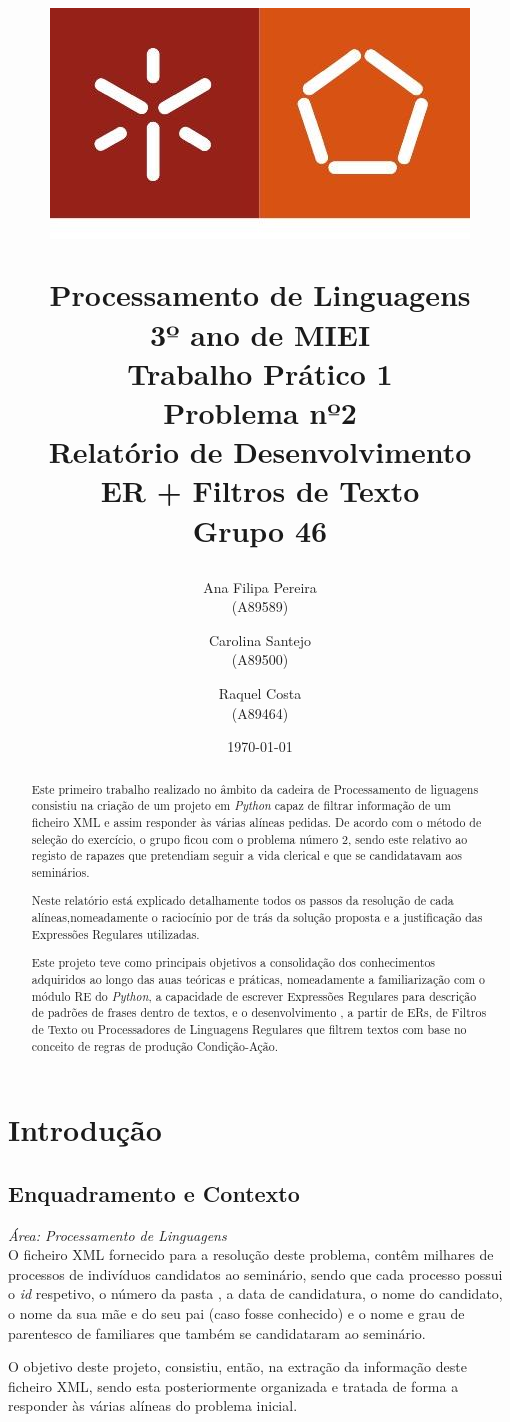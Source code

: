 \documentclass[11pt,a4paper]{report}
\title{

\begin{center}
\includegraphics[scale=0.3]{images/um}
\end{center}

Processamento de Linguagens \\
		3º ano de MIEI\\  \vspace{1cm}
       \textbf{Trabalho Prático 1\\ 
			Problema nº2}\\  \vspace{1cm} Relatório de Desenvolvimento \\
      ER + Filtros de Texto \\ \vspace{2cm}
\large{Grupo 46}}
\author{ Ana Filipa Pereira\\ (A89589) \and Carolina Santejo\\ (A89500)
         \and Raquel Costa\\ (A89464)
       }
\date{\vspace{2cm}\today}
\def\area#1{{\em \'{A}rea: #1}\\[0.2cm]}
\begin{document}
\maketitle %




\begin{abstract}  %
	\qquad Este primeiro trabalho realizado no âmbito da cadeira de Processamento de liguagens consistiu na criação de um projeto em \textit{Python} capaz de filtrar informação de um ficheiro XML e assim responder às várias alíneas pedidas. De acordo com o método de seleção do exercício, o grupo ficou com o problema número 2, sendo este relativo ao registo de rapazes que pretendiam seguir a vida clerical e que se candidatavam aos seminários.\par
	\qquad Neste relatório está explicado detalhamente todos os passos da resolução de cada alíneas,nomeadamente o raciocínio por de trás da solução proposta e a justificação das Expressões Regulares utilizadas.\par
	\qquad Este projeto teve como principais objetivos a consolidação dos conhecimentos adquiridos ao longo das auas teóricas e práticas, nomeadamente a familiarização  com o módulo RE do \textit{Python}, a capacidade de escrever Expressões Regulares para descrição de padrões de frases dentro de textos, e o desenvolvimento , a partir de ERs, de Filtros de Texto ou Processadores de Linguagens Regulares que filtrem textos com base no conceito de regras de produção Condição-Ação.
\end{abstract}



\tableofcontents 

\listoffigures 




\chapter{Introdução} \label{chap:intro} 			%


\section{Enquadramento e Contexto}
\area{Processamento de Linguagens}


	\qquad O ficheiro XML fornecido para a resolução deste problema, contêm milhares de processos de indivíduos candidatos ao seminário, sendo que cada processo possui o \textit{id} respetivo, o número da pasta , a data de candidatura, o nome do candidato, o nome da sua mãe e do seu pai (caso fosse conhecido) e o nome e grau de parentesco de familiares que também se candidataram ao seminário.\par
	\qquad O objetivo deste projeto, consistiu, então, na extração da informação deste ficheiro XML, sendo esta posteriormente organizada e tratada de forma a responder às várias alíneas do problema inicial.
\end{document}

